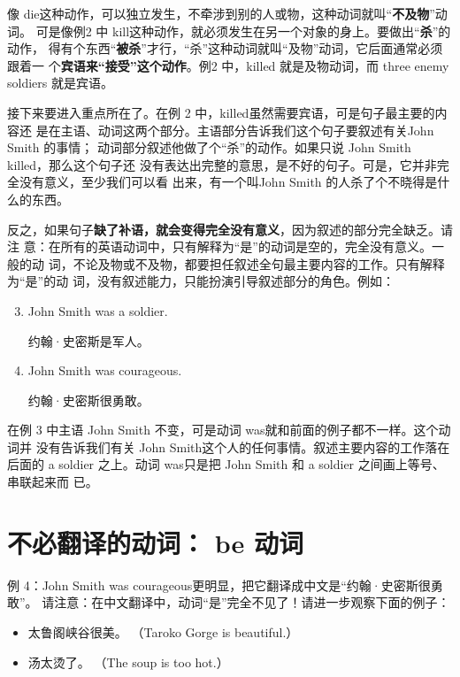 像 die这种动作，可以独立发生，不牵涉到别的人或物，这种动词就叫“\textbf{不及物}”动词。
可是像例2 中 kill这种动作，就必须发生在另一个对象的身上。要做出“\textbf{杀}”的动作，
得有个东西“\textbf{被杀}”才行，“杀”这种动词就叫“及物”动词，它后面通常必须跟着一
个\textbf{宾语来“接受”这个动作}。例2 中，killed 就是及物动词，而 three enemy
soldiers 就是宾语。

接下来要进入重点所在了。在例 2 中，killed虽然需要宾语，可是句子最主要的内容还
是在主语、动词这两个部分。主语部分告诉我们这个句子要叙述有关John Smith 的事情；
动词部分叙述他做了个“杀”的动作。如果只说 John Smith killed，那么这个句子还
没有表达出完整的意思，是不好的句子。可是，它并非完全没有意义，至少我们可以看
出来，有一个叫John Smith 的人杀了个不晓得是什么的东西。

反之，如果句子\textbf{缺了补语，就会变得完全没有意义}，因为叙述的部分完全缺乏。请注
意：在所有的英语动词中，只有解释为“是”的动词是空的，完全没有意义。一般的动
词，不论及物或不及物，都要担任叙述全句最主要内容的工作。只有解释为“是”的动
词，没有叙述能力，只能扮演引导叙述部分的角色。例如：

\begin{enumerate}
  \setcounter{enumi}{2}
\item John Smith was a soldier.

  约翰·史密斯是军人。
\item John Smith was courageous.

  约翰·史密斯很勇敢。
\end{enumerate}

在例 3 中主语 John Smith 不变，可是动词 was就和前面的例子都不一样。这个动词并
没有告诉我们有关 John Smith这个人的任何事情。叙述主要内容的工作落在后面的 a
soldier 之上。动词 was只是把 John Smith 和 a soldier 之间画上等号、串联起来而
已。

\section{不必翻译的动词： be 动词}

例 4：John Smith was courageous更明显，把它翻译成中文是“约翰·史密斯很勇敢”。
请注意：在中文翻译中，动词“是”完全不见了！请进一步观察下面的例子：

\begin{itemize}
\item 太鲁阁峡谷很美。 （Taroko Gorge is beautiful.）
\item 汤太烫了。 （The soup is too hot.）
\end{itemize}

